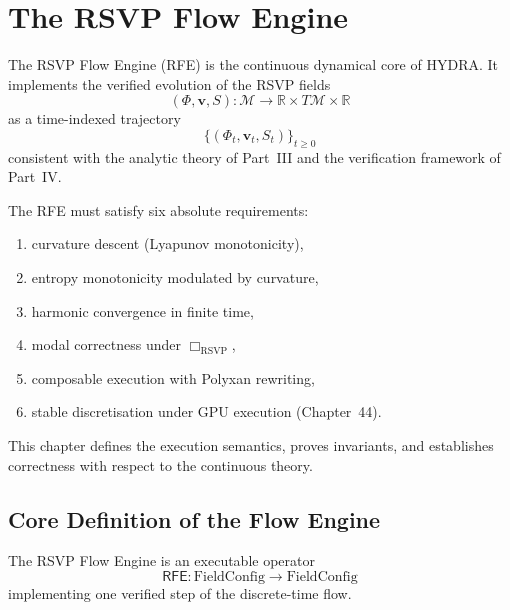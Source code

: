 \chapter{The RSVP Flow Engine}
\label{ch:47}

The RSVP Flow Engine (RFE) is the continuous dynamical core of HYDRA.
It implements the verified evolution of the RSVP fields
\[
(\Phi,\mathbf{v},S) : \mathcal{M} \longrightarrow \mathbb{R}\times T\mathcal{M}\times\mathbb{R}
\]
as a time-indexed trajectory
\[
\{(\Phi_t,\mathbf{v}_t,S_t)\}_{t\ge 0}
\]
consistent with the analytic theory of Part~III and the verification framework of Part~IV.

The RFE must satisfy six absolute requirements:
\begin{enumerate}
\item curvature descent (Lyapunov monotonicity),
\item entropy monotonicity modulated by curvature,
\item harmonic convergence in finite time,
\item modal correctness under $\Box_{\mathrm{RSVP}}$,
\item composable execution with Polyxan rewriting,
\item stable discretisation under GPU execution (Chapter~44).
\end{enumerate}

This chapter defines the execution semantics, proves invariants, and establishes correctness with respect to the continuous theory.

\section{Core Definition of the Flow Engine}

The RSVP Flow Engine is an executable operator
\[
\mathsf{RFE} : \mathrm{FieldConfig} \longrightarrow \mathrm{FieldConfig}
\]
implementing one verified step of the discrete-time flow.

